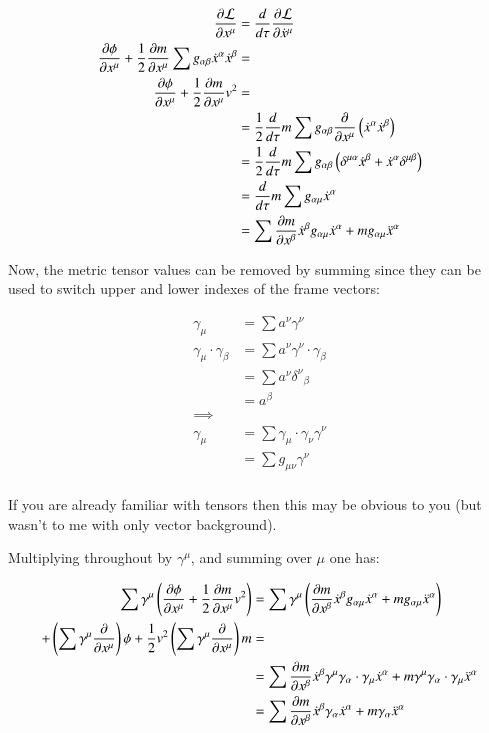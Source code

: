 \documentclass{article}      %
\newcommand{\LL}[0]{\mathcal{L}}
\newcommand{\PD}[2]{\frac{\partial {#2}}{\partial {#1}}}
\newcommand{\xdot}[0]{\dot{x}}
\newcommand{\xddot}[0]{\ddot{x}}
\begin{document}
\begin{align*}
\PD{x^{\mu}}{\LL} &= \frac{d}{d\tau} \PD{\xdot^{\mu}}{\LL} \\
\PD{x^{\mu}}{\phi} + \inv{2} \PD{x^{\mu}}{m} \sum g_{\alpha\beta} \xdot^{\alpha} \xdot^{\beta} &= \\
\PD{x^{\mu}}{\phi} + \inv{2} \PD{x^{\mu}}{m} v^2 &= \\
&= \inv{2} \frac{d}{d\tau} m \sum g_{\alpha\beta} \PD{x^{\mu}}{}\left(\xdot^{\alpha} \xdot^{\beta}\right) \\
&= \inv{2} \frac{d}{d\tau} m \sum g_{\alpha\beta} \left(\delta^{\mu\alpha} \xdot^{\beta} + \xdot^{\alpha} \delta^{\mu\beta}\right) \\
&= \frac{d}{d\tau} m \sum g_{\alpha\mu} \xdot^{\alpha} \\
&= \sum \PD{x^{\beta}}{m} \xdot^{\beta} g_{\alpha\mu} \xdot^{\alpha} + m g_{\alpha\mu} \xddot^{\alpha} \\
\end{align*}

Now, the metric tensor values can be removed by summing since they can be used to switch upper and lower indexes of the frame vectors:

\begin{align*}
\gamma_{\mu} &= \sum a^{\nu} \gamma^{\nu} \\
\gamma_{\mu} \cdot \gamma_{\beta}
&= \sum a^{\nu} \gamma^{\nu} \cdot \gamma_{\beta} \\
&= \sum a^{\nu} {\delta^{\nu}}_{\beta} \\
&= a^{\beta} \\
\implies \\
\gamma_{\mu}
&= \sum \gamma_{\mu} \cdot \gamma_{\nu} \gamma^{\nu} \\
&= \sum g_{\mu\nu} \gamma^{\nu} \\
\end{align*}

If you are already familiar with tensors then this may be obvious to you (but wasn't to me with only vector background).

Multiplying throughout by $\gamma^{\mu}$, and summing over $\mu$ one has:

\begin{align*}
\sum \gamma^{\mu} \left( \PD{x^{\mu}}{\phi} + \inv{2} \PD{x^{\mu}}{m} v^2 \right) 
&= \sum \gamma^{\mu} \left(\PD{x^{\beta}}{m} \xdot^{\beta} g_{\alpha\mu} \xdot^{\alpha} + m g_{\alpha\mu} \xddot^{\alpha} \right) \\
+ \left(\sum \gamma^{\mu} \PD{x^{\mu}}{}\right) \phi + \inv{2} v^2 \left(\sum \gamma^{\mu} \PD{x^{\mu}}{}\right) m &= \\
&= \sum \PD{x^{\beta}}{m} \xdot^{\beta} \gamma^{\mu} \gamma_{\alpha} \cdot \gamma_{\mu} \xdot^{\alpha} + m \gamma^{\mu} \gamma_{\alpha} \cdot \gamma_{\mu} \xddot^{\alpha}  \\
&= \sum \PD{x^{\beta}}{m} \xdot^{\beta} \gamma_{\alpha} \xdot^{\alpha} + m \gamma_{\alpha} \xddot^{\alpha}  \\
\end{align*}
\end{document}
